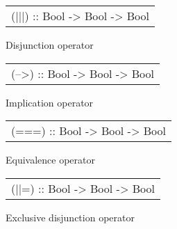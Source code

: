\begin{haddockdesc}
\item[\begin{tabular}{@{}l}
(|||) :: Bool -> Bool -> Bool
\end{tabular}]
{\haddockbegindoc
Disjunction operator\par}
\end{haddockdesc}
\begin{haddockdesc}
\item[\begin{tabular}{@{}l}
(-->) :: Bool -> Bool -> Bool
\end{tabular}]
{\haddockbegindoc
Implication operator\par}
\end{haddockdesc}
\begin{haddockdesc}
\item[\begin{tabular}{@{}l}
(===) :: Bool -> Bool -> Bool
\end{tabular}]
{\haddockbegindoc
Equivalence operator\par}
\end{haddockdesc}
\begin{haddockdesc}
\item[\begin{tabular}{@{}l}
(||=) :: Bool -> Bool -> Bool
\end{tabular}]
{\haddockbegindoc
Exclusive disjunction operator\par}
\end{haddockdesc}
